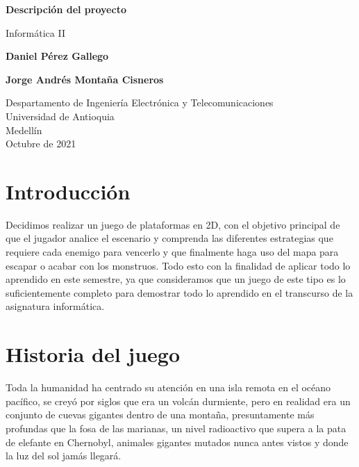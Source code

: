 \documentclass{article}
\begin{document}
\begin{titlepage}
    \begin{center}
        \vspace*{1cm}
            
        \Huge
        \textbf{Descripción del proyecto}
            
        \vspace{0.5cm}
        \LARGE
        Informática II
            
        \vspace{1.7cm}
            
        \textbf{Daniel Pérez Gallego}
        
        \vspace{0.3cm}
        
        \textbf{Jorge Andrés Montaña Cisneros}
            
        \vfill
            
        \vspace{0.8cm}
            
        \Large
        Despartamento de Ingeniería Electrónica y Telecomunicaciones\\
        Universidad de Antioquia\\
        Medellín\\
        Octubre de 2021
            
    \end{center}
\end{titlepage}

\tableofcontents

\section{Introducción}
Decidimos realizar un juego de plataformas en 2D, con el objetivo principal de que el jugador analice el escenario y comprenda las diferentes estrategias que requiere cada enemigo para vencerlo y que finalmente haga uso del mapa para escapar o acabar con los monstruos. Todo esto con la finalidad de aplicar todo lo aprendido en este semestre, ya que consideramos que un juego de este tipo es lo suficientemente completo para demostrar todo lo aprendido en el transcurso de la asignatura informática.

\section{Historia del juego}
Toda la humanidad ha centrado su atención en una isla remota en el océano pacífico, se creyó por siglos que era un volcán durmiente, pero en realidad era un conjunto de cuevas gigantes dentro de una montaña, presuntamente más profundas que la fosa de las marianas, un nivel radioactivo que supera a la pata de elefante en Chernobyl, animales gigantes mutados nunca antes vistos y donde la luz del sol jamás llegará.\\
\end{document}
